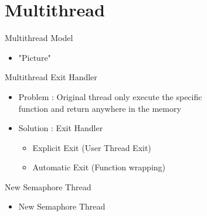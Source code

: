 \documentclass{beamer}
\begin{document}
\section{Multithread}
\begin{frame}{Multithread Model}
  \begin{itemize}
    \item "Picture"
  \end{itemize}
\end{frame}
\begin{frame}{Multithread Exit Handler}
  \begin{itemize}
    \item Problem : Original thread only execute the specific 
    \\function and return anywhere in the memory 
    \item Solution : Exit Handler
    \begin{itemize}
		\item Explicit Exit (User Thread Exit)
		\item Automatic Exit (Function wrapping)
    \end{itemize}
  \end{itemize}
\end{frame}
\begin{frame}{New Semaphore Thread}
  \begin{itemize}
    \item New Semaphore Thread
  \end{itemize}
\end{frame}
\end{document}
